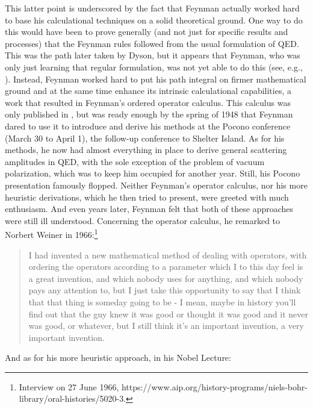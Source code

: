 \documentclass[12pt]{article}
\begin{document}
This latter point is underscored by the fact that Feynman actually worked hard to base his calculational techniques on a solid theoretical ground. One way to do this would have been to prove generally (and not just for specific results and processes) that the Feynman rules followed from the usual formulation of QED. This was the path later taken by Dyson, but it appears that Feynman, who was only just learning that regular formulation, was not yet able to do this (see, e.g., \citep[p. 144]{wuethrich_2010_the-genesis}).  Instead, Feynman worked hard to put his path integral on firmer mathematical ground and at the same time enhance its intrinsic calculational capabilities, a work that resulted in Feynman's ordered operator calculus. This calculus was only published in \citep{feynman_1951_an-operator}, but was ready enough by the spring of 1948 that Feynman dared to use it to introduce and derive his methods at the Pocono conference (March 30 to April 1), the follow-up conference to Shelter Island. As for his methods, he now had almost everything in place to derive general scattering amplitudes in QED, with the sole exception of the problem of vacuum polarization, which was to keep him occupied for another year. Still, his Pocono presentation famously flopped. Neither Feynman's operator calculus, nor his more heuristic derivations, which he then tried to present, were greeted with much enthusiasm. And even years later, Feynman felt that both of these approaches were still ill understood. Concerning the operator calculus, he remarked to Norbert Weiner in 1966:\footnote{Interview on 27 June 1966, https://www.aip.org/history-programs/niels-bohr-library/oral-histories/5020-3.}

\begin{quote}
I had invented a new mathematical method of dealing with operators, with ordering the operators according to a parameter which I to this day feel is a great invention, and which nobody uses for anything, and which nobody pays any attention to, but I just take this opportunity to say that I think that that thing is someday going to be - I mean, maybe in history you'll find out that the guy knew it was good or thought it was good and it never was good, or whatever, but I still think it's an important invention, a very important invention.
\end{quote}

And as for his more heuristic approach, in his Nobel Lecture:
\end{document}
